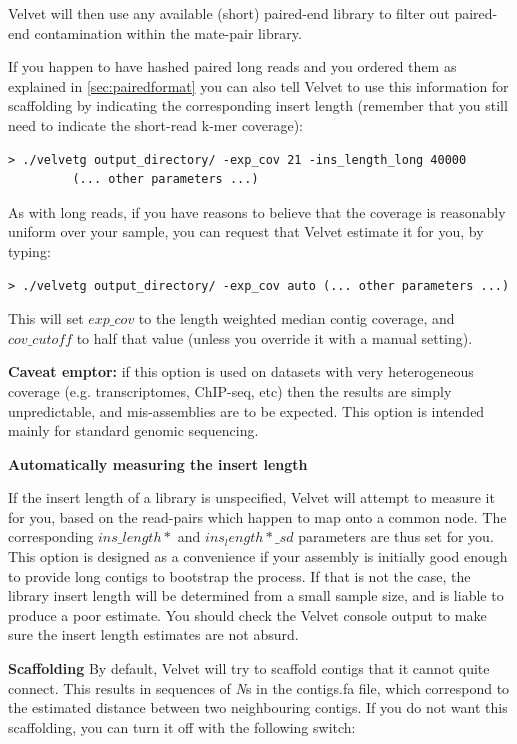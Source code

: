 \documentclass{article}
\begin{document}
Velvet will then use any available (short) paired-end library to filter out paired-end contamination within the mate-pair library.

If you happen to have hashed paired long reads and you ordered them as explained in \ref{sec:pairedformat} you can also tell Velvet to use this information for scaffolding by indicating the corresponding insert length (remember that you still need to indicate the short-read k-mer coverage):

\begin{verbatim}
> ./velvetg output_directory/ -exp_cov 21 -ins_length_long 40000 
		 (... other parameters ...)
\end{verbatim}

As with long reads, if you have reasons to believe that the coverage is reasonably uniform over your sample, you can request that Velvet estimate it for you, by typing:

\begin{verbatim}
> ./velvetg output_directory/ -exp_cov auto (... other parameters ...)
\end{verbatim}

This will set $exp\_cov$ to the length weighted median contig coverage, and $cov\_cutoff$ to half that value (unless you override it with a manual setting).

\textbf{Caveat emptor:} if this option is used on datasets with very heterogeneous coverage (e.g. transcriptomes, ChIP-seq, etc) then the results are simply unpredictable, and mis-assemblies are to be expected. This option is intended mainly for standard genomic sequencing.

\textbf{Automatically measuring the insert length} 

If the insert length of a library is unspecified, Velvet will attempt to measure it for you, based on the read-pairs which happen to map onto a common node. The corresponding $ins\_length*$ and $ins_length*\_sd$ parameters are thus set for you. This option is designed as a convenience if your assembly is initially good enough to provide long contigs to bootstrap the process. If that is not the case, the library insert length will be determined from a small sample size, and is liable to produce a poor estimate. You should check the Velvet console output to make sure the insert length estimates are not absurd.

\textbf{Scaffolding} By default, Velvet will try to scaffold contigs that it cannot quite connect. This results in sequences of \emph{N}s in the contigs.fa file, which correspond to the estimated distance between two neighbouring contigs. If you do not want this scaffolding, you can turn it off with the following switch:
\end{document}
